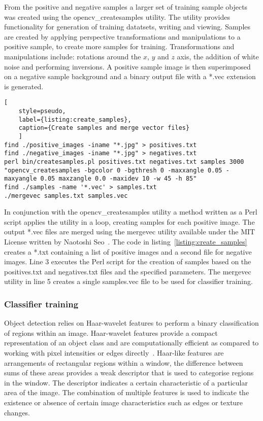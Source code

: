 From the positive and negative samples a larger set of training sample objects was created using the opencv\_createsamples utility. The utility provides functionality for generation of training datatsets, writing and viewing. Samples are created by applying perspective transformations and manipulations to a positive sample, to create more samples for training. Transformations and  manipulations include: rotations around the $x$, $y$ and $z$ axis, the addition of white noise and performing inversions. A positive sample image is then superimposed on a negative sample background and a binary output file with a *.vec extension is generated.

\begin{lstlisting}[
	style=pseudo,
	label={listing:create_samples},
	caption={Create samples and merge vector files}
	]
find ./positive_images -iname "*.jpg" > positives.txt
find ./negative_images -iname "*.jpg" > negatives.txt
perl bin/createsamples.pl positives.txt negatives.txt samples 3000 "opencv_createsamples -bgcolor 0 -bgthresh 0 -maxxangle 0.05 -maxyangle 0.05 maxzangle 0.0 -maxidev 10 -w 45 -h 85"
find ./samples -name '*.vec' > samples.txt
./mergevec samples.txt samples.vec
\end{lstlisting}

In conjunction with the opencv\_createsamples utility a method written as a Perl script applies the utility in a loop, creating samples for each positive image. The output *.vec files are merged using the mergevec utility available under the MIT License written by Naotoshi Seo~\cite{Seo}. The code in listing~\ref{listing:create_samples} creates a *.txt containing a list of positive images and a second file for negative images. Line 3 executes the Perl script for the creation of samples based on the positives.txt and negatives.txt files and the specified parameters. The mergevec utility in line 5 creates a single samples.vec file to be used for classifier training.

\subsubsection{Classifier training}
Object detection relies on Haar-wavelet features to perform a binary classification of regions within an image. Haar-wavelet features provide a compact representation of an object class and are computationally efficient as compared to working with pixel intensities or edges directly~\cite{Papageorgiou1998}. Haar-like features are arrangements of rectangular regions within a window, the difference between sums of these areas provides a weak descriptor that is used to categorise regions in the window. The descriptor indicates a certain characteristic of a particular area of the image. The combination of multiple features is used to indicate the existence or absence of certain image characteristics such as edges or texture changes.

